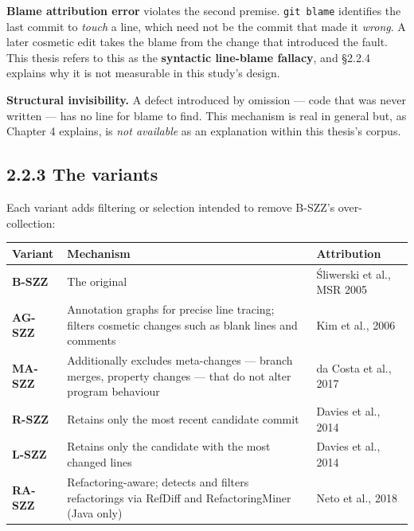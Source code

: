 \textbf{Blame attribution error} violates the second premise.
\texttt{git\ blame} identifies the last commit to \emph{touch} a line,
which need not be the commit that made it \emph{wrong}. A later cosmetic
edit takes the blame from the change that introduced the fault. This
thesis refers to this as the \textbf{syntactic line-blame fallacy}, and
\S{}2.2.4 explains why it is not measurable in this study's design.

\textbf{Structural invisibility.} A defect introduced by omission ---
code that was never written --- has no line for blame to find. This
mechanism is real in general but, as Chapter 4 explains, is \emph{not
available} as an explanation within this thesis's corpus.

\subsection{2.2.3 The variants}\label{the-variants}

Each variant adds filtering or selection intended to remove B-SZZ's
over-collection:

\begin{longtable}[]{@{}
  >{\raggedright\arraybackslash}p{}
  >{\raggedright\arraybackslash}p{}
  >{\raggedright\arraybackslash}p{}@{}}
\toprule\noalign{}
\begin{minipage}[b]{\linewidth}\raggedright
Variant
\end{minipage} & \begin{minipage}[b]{\linewidth}\raggedright
Mechanism
\end{minipage} & \begin{minipage}[b]{\linewidth}\raggedright
Attribution
\end{minipage} \\
\midrule\noalign{}
\endhead
\bottomrule\noalign{}
\endlastfoot
\textbf{B-SZZ} & The original & \'{S}liwerski et al., MSR 2005 \\
\textbf{AG-SZZ} & Annotation graphs for precise line tracing; filters
cosmetic changes such as blank lines and comments & Kim et al., 2006 \\
\textbf{MA-SZZ} & Additionally excludes meta-changes --- branch merges,
property changes --- that do not alter program behaviour & da Costa et
al., 2017 \\
\textbf{R-SZZ} & Retains only the most recent candidate commit & Davies
et al., 2014 \\
\textbf{L-SZZ} & Retains only the candidate with the most changed lines
& Davies et al., 2014 \\
\textbf{RA-SZZ} & Refactoring-aware; detects and filters refactorings
via RefDiff and RefactoringMiner (Java only) & Neto et al., 2018 \\
\end{longtable}

